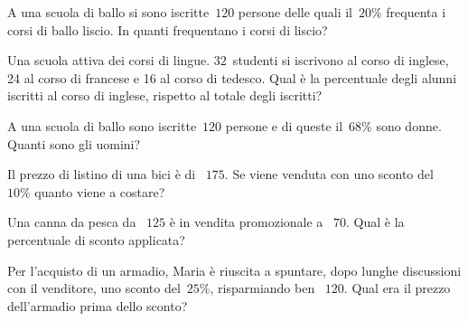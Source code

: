\begin{esercizio}
 \label{ese:3.85}
A una scuola di ballo si sono iscritte~$120$ persone delle quali il~$20\%$ frequenta i corsi di ballo liscio.
In quanti frequentano i corsi di liscio?
\end{esercizio}

\begin{esercizio}
 \label{ese:3.86}
Una scuola attiva dei corsi di lingue. $32$~studenti si iscrivono al corso di inglese, 24 al
corso di francese e 16 al corso di tedesco.
Qual è la percentuale degli alunni iscritti al corso di inglese, rispetto al totale degli iscritti?
\end{esercizio}

\begin{esercizio}
 \label{ese:3.87}
A una scuola di ballo sono iscritte~$120$ persone e di queste il~$68\%$ sono donne. Quanti sono gli uomini?
\end{esercizio}

\begin{esercizio}
 \label{ese:3.88}
 Il prezzo di listino di una bici è di \officialeuro~$175$. Se viene venduta con uno sconto del~$10\%$ quanto viene a costare?
\end{esercizio}

\begin{esercizio}[\Ast]
 \label{ese:3.89}
Una canna da pesca da \officialeuro~$125$ è in vendita promozionale a \officialeuro~$70$.
Qual è la percentuale di sconto applicata?
\end{esercizio}

\begin{esercizio}[\Ast]
 \label{ese:3.90}
Per l'acquisto di un armadio, Maria è riuscita a spuntare, dopo lunghe discussioni con il venditore, uno sconto del~$25\%$, risparmiando ben \officialeuro~$120$. Qual era il prezzo dell'armadio prima dello sconto?
\end{esercizio}

